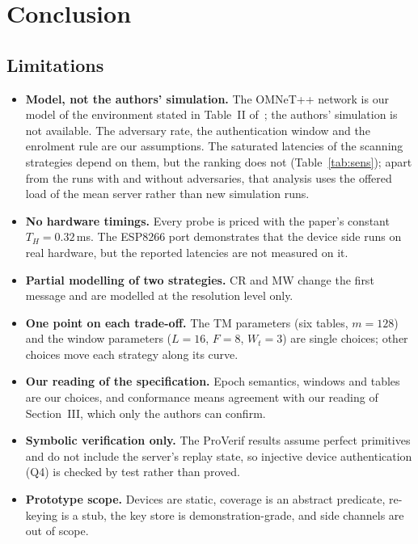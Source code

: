 \chapter{Conclusion}

\section{Limitations}
\begin{itemize}
\item \textbf{Model, not the authors' simulation.} The OMNeT++ network is our model of the environment stated in Table~II of~\cite{base}; the authors' simulation is not available. The adversary rate, the authentication window and the enrolment rule are our assumptions. The saturated latencies of the scanning strategies depend on them, but the ranking does not (Table~\ref{tab:sens}); apart from the runs with and without adversaries, that analysis uses the offered load of the mean server rather than new simulation runs.
\item \textbf{No hardware timings.} Every probe is priced with the paper's constant $T_H=0.32$\,ms. The ESP8266 port demonstrates that the device side runs on real hardware, but the reported latencies are not measured on it.
\item \textbf{Partial modelling of two strategies.} CR and MW change the first message and are modelled at the resolution level only.
\item \textbf{One point on each trade-off.} The TM parameters (six tables, $m=128$) and the window parameters ($L=16$, $F=8$, $W_t=3$) are single choices; other choices move each strategy along its curve.
\item \textbf{Our reading of the specification.} Epoch semantics, windows and tables are our choices, and conformance means agreement with our reading of Section~III, which only the authors can confirm.
\item \textbf{Symbolic verification only.} The ProVerif results assume perfect primitives and do not include the server's replay state, so injective device authentication (Q4) is checked by test rather than proved.
\item \textbf{Prototype scope.} Devices are static, coverage is an abstract predicate, re-keying is a stub, the key store is demonstration-grade, and side channels are out of scope.
\end{itemize}

